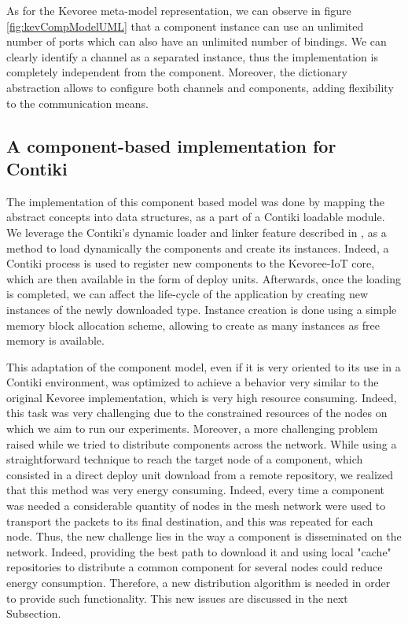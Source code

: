 As for the Kevoree meta-model representation, we can observe in figure \ref{fig:kevCompModelUML} that a component instance can use an unlimited number of ports which can also have an unlimited number of bindings.
We can clearly identify a channel as a separated instance, thus the implementation is completely independent from the component.
Moreover, the dictionary abstraction allows to configure both channels and components, adding flexibility to the communication means.

\subsection{A component-based implementation for Contiki}
\label{subsec:contikiCompModel}
The implementation of this component based model was done by mapping the abstract concepts into data structures, as a part of a Contiki loadable module.
We leverage the Contiki's dynamic loader and linker feature described in \cite{dunkels06runtime}, as a method to load dynamically the components and create its instances.
Indeed, a Contiki process is used to register new components to the Kevoree-IoT core, which are then available in the form of deploy units.
Afterwards, once the loading is completed, we can affect the life-cycle of the application by creating new instances of the newly downloaded type.
Instance creation is done using a simple memory block allocation scheme, allowing to create as many instances as free memory is available.

This adaptation of the component model, even if it is very oriented to its use in a Contiki environment, was optimized to achieve a behavior very similar to the original Kevoree implementation, which is very high resource consuming.
Indeed, this task was very challenging due to the constrained resources of the nodes on which we aim to run our experiments.
Moreover, a more challenging problem raised while we tried to distribute components across the network.
While using a straightforward technique to reach the target node of a component, which consisted in a direct deploy unit download from a remote repository, we realized that this method was very energy consuming.
Indeed, every time a component was needed a considerable quantity of nodes in the mesh network were used to transport the packets to its final destination, and this was repeated for each node.
Thus, the new challenge lies in the way a component is disseminated on the network.
Indeed, providing the best path to download it and using local "cache" repositories to distribute a common component for several nodes could reduce energy consumption.
Therefore, a new distribution algorithm is needed in order to provide such functionality.
This new issues are discussed in the next Subsection.

